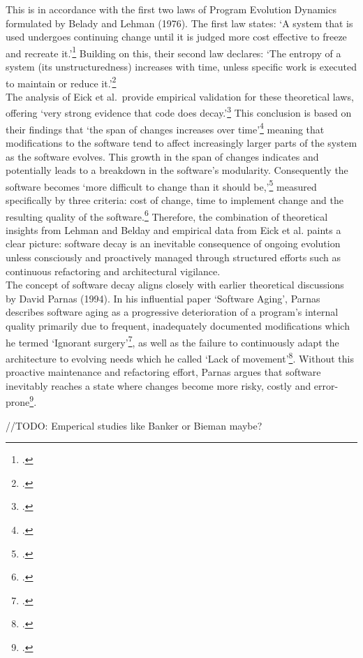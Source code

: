 This is in accordance with the first two laws of Program Evolution Dynamics formulated by Belady and Lehman (1976).
The first law states: `A system that is used undergoes continuing change until it is judged more cost effective to freeze and recreate it.'\footcite[228]{beladyModelLargeProgram1976}
Building on this, their second law declares: `The entropy of a system (its unstructuredness) increases with time, unless specific work is executed to maintain or reduce it.'\footcite[228]{beladyModelLargeProgram1976}\\

The analysis of Eick et al.\ provide empirical validation for these theoretical laws, offering `very strong evidence that code does decay.'\footcite[7]{eickDoesCodeDecay2001}
This conclusion is based on their findings that `the span of changes increases over time'\footcite[7]{eickDoesCodeDecay2001} meaning that modifications to the software tend to affect increasingly larger parts of the system as the software evolves. This growth in the span of changes indicates and potentially leads to
a breakdown in the software's modularity. Consequently the software becomes `more difficult to change than it should be,'\footcite[3]{eickDoesCodeDecay2001} measured specifically by three criteria: cost of change, time to implement change and the resulting quality of the software.\footcite[3]{eickDoesCodeDecay2001}
Therefore, the combination of theoretical insights from Lehman and Belday and empirical data from Eick et al. paints a clear picture: software decay is an inevitable consequence of ongoing evolution unless consciously and proactively managed through structured efforts such as continuous refactoring and architectural vigilance.\\

The concept of software decay aligns closely with earlier theoretical discussions by David Parnas (1994). In his influential paper `Software Aging', Parnas describes software aging as a progressive deterioration of a program's internal quality primarily due to frequent, 
inadequately documented modifications which he termed `Ignorant surgery'\footcite[280]{296790}, as well as the failure to continuously adapt the architecture to evolving needs which he called `Lack of movement'\footcite[280]{296790}.
Without this proactive maintenance and refactoring effort, Parnas argues that software inevitably reaches a state where changes become more risky, costly and error-prone\footcite[280-281]{296790}.

//TODO: Emperical studies like Banker or Bieman maybe?

